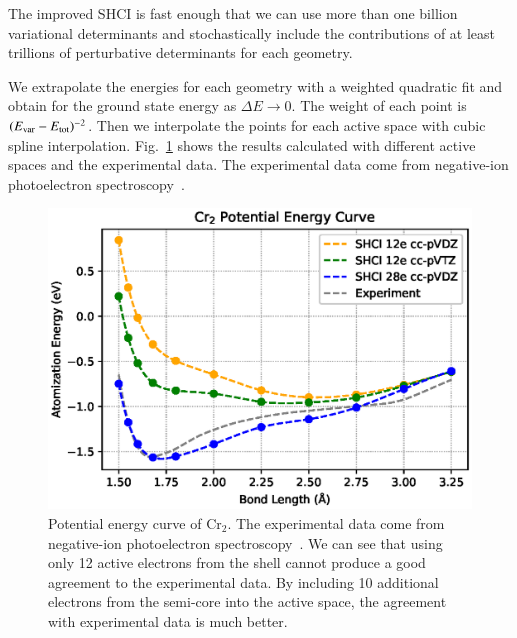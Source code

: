 The improved SHCI is fast enough that we can use more than one billion variational determinants and stochastically include the contributions of at least trillions of perturbative determinants for each geometry.

We extrapolate the energies for each geometry with a weighted quadratic fit
and obtain for the ground state energy as $\Delta E\to0$.
The weight of each point is $(E_{\rm var} - E_{\rm tot})^{-2}$.
Then we interpolate the points for each active space with cubic spline interpolation.
Fig.~\ref{fig:cr2curve} shows the results calculated with different active spaces and the experimental data.
The experimental data come from negative-ion photoelectron spectroscopy~\cite{casey1993negative}.

\label{sec:curve}
\begin{figure}
  \begin{center}
  \includegraphics[width=0.9\linewidth]{figs/cr2curve.eps}
  \caption{Potential energy curve of Cr$_2$.
  The experimental data come from negative-ion photoelectron spectroscopy~\cite{casey1993negative}.
  We can see that using only 12 active electrons from the shell cannot produce a good agreement to the experimental data.
  By including 10 additional electrons from the semi-core into the active space, the agreement with experimental data is much better.
}
  \label{fig:cr2curve}
  \end{center}
\end{figure}

